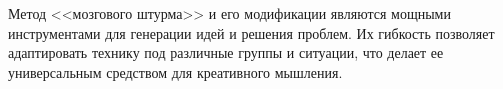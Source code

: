 Метод <<мозгового штурма>> и его модификации являются мощными инструментами для генерации идей и решения проблем. Их гибкость позволяет адаптировать технику под различные группы и ситуации, что делает ее универсальным средством для креативного мышления.
